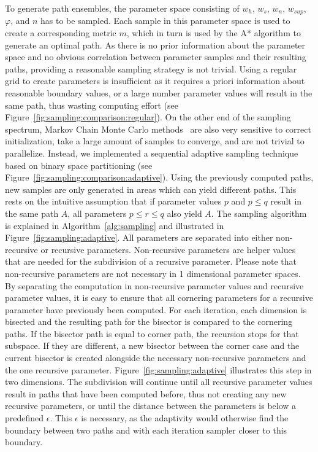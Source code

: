\documentclass{egpubl}
\begin{document}
To generate path ensembles, the parameter space consisting of $w_h$, $w_s$, $w_n$, $w_{sup}$, $\varphi$, and $n$ has to be sampled. Each sample in this parameter space is used to create a corresponding metric $m$, which in turn is used by the A* algorithm to generate an optimal path. As there is no prior information about the parameter space and no obvious correlation between parameter samples and their resulting paths, providing a reasonable sampling strategy is not trivial. Using a regular grid to create parameters is insufficient as it requires a priori information about reasonable boundary values, or a large number parameter values will result in the same path, thus wasting computing effort (see Figure~\ref{fig:sampling:comparison:regular}). On the other end of the sampling spectrum, Markov Chain Monte Carlo methods~\cite{gilks2005markov} are also very sensitive to correct initialization, take a large amount of samples to converge, and are not trivial to parallelize. Instead, we implemented a sequential adaptive sampling technique based on binary space partitioning (see Figure~\ref{fig:sampling:comparison:adaptive}). Using the previously computed paths, new samples are only generated in areas which can yield different paths. This rests on the intuitive assumption that if parameter values $p$ and $p \le q$ result in the same path $A$, all parameters $p \leq r \leq q$ also yield $A$. The sampling algorithm is explained in Algorithm~\ref{alg:sampling} and illustrated in Figure~\ref{fig:sampling:adaptive}. All parameters are separated into either non-recursive or recursive parameters. Non-recursive parameters are helper values that are needed for the subdivision of a recursive parameter. Please note that non-recursive parameters are not necessary in 1 dimensional parameter spaces. By separating the computation in non-recursive parameter values and recursive parameter values, it is easy to ensure that all cornering parameters for a recursive parameter have previously been computed. For each iteration, each dimension is bisected and the resulting path for the bisector is compared to the cornering paths. If the bisector path is equal to corner path, the recursion stops for that subspace. If they are different, a new bisector between the corner case and the current bisector is created alongside the necessary non-recursive parameters and the one recursive parameter. Figure~\ref{fig:sampling:adaptive} illustrates this step in two dimensions. The subdivision will continue until all recursive parameter values result in paths that have been computed before, thus not creating any new recursive parameters, or until the distance between the parameters is below a predefined $\epsilon$. This $\epsilon$ is necessary, as the adaptivity would otherwise find the boundary between two paths and with each iteration sampler closer to this boundary.
\end{document}
